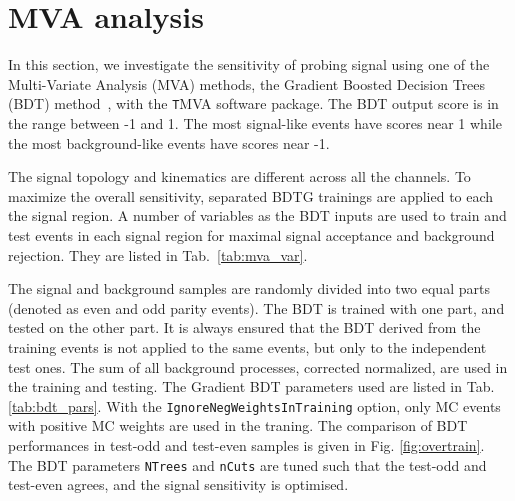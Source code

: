 \section{MVA analysis}
\label{sec:mva}

In this section, we investigate the sensitivity of probing signal using one of the Multi-Variate Analysis (MVA) methods, the Gradient Boosted Decision Trees (BDT) method~\cite{BDT,BDT2}, with the {\texttt TMVA} software package. The BDT output score is in the range between -1 and 1. The most signal-like events have scores near 1 while the most background-like events have scores near -1.

The signal topology and kinematics are different across all the channels. To maximize the overall sensitivity, separated BDTG trainings are applied to each the signal region. A number of variables as the BDT inputs are used to train and test events in each signal region for maximal signal acceptance and background rejection. They are listed in Tab.~\ref{tab:mva_var}. 



The signal and background samples are randomly divided into two equal parts (denoted as even and odd parity events). The BDT is trained with one part, and tested on the other part. It is always ensured that the BDT derived from the training events is not applied to the same events, but only to the independent test ones. The sum of all background processes, corrected normalized, are used in the training and testing. The Gradient BDT parameters used are listed in Tab. \ref{tab:bdt_pars}. With the \texttt{IgnoreNegWeightsInTraining} option, only MC events with positive MC weights are used in the traning. The comparison of BDT performances in test-odd and test-even samples is given in Fig. \ref{fig:overtrain}. The BDT parameters \texttt{NTrees} and \texttt{nCuts} are tuned such that the test-odd and test-even agrees, and the signal sensitivity is optimised.

